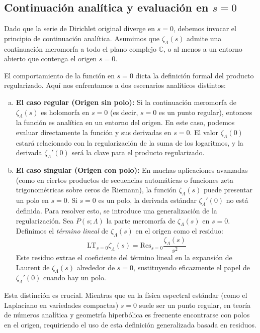 \subsection{Continuación analítica y evaluación en $s=0$}

Dado que la serie de Dirichlet original diverge en $s=0$, debemos invocar el principio de continuación analítica. Asumimos que $\zeta_\Lambda(s)$ admite una continuación meromorfa a todo el plano complejo $\mathbb{C}$, o al menos a un entorno abierto que contenga el origen $s=0$. 

El comportamiento de la función en $s=0$ dicta la definición formal del producto regularizado. Aquí nos enfrentamos a dos escenarios analíticos distintos:

\begin{enumerate}[a)]
    \item \textbf{El caso regular (Origen sin polo):} Si la continuación meromorfa de $\zeta_\Lambda(s)$ es holomorfa en $s=0$ (es decir, $s=0$ es un punto regular), entonces la función es analítica en un entorno del origen. En este caso, podemos evaluar directamente la función y sus derivadas en $s=0$. El valor $\zeta_\Lambda(0)$ estará relacionado con la regularización de la suma de los logaritmos, y la derivada $\zeta_\Lambda'(0)$ será la clave para el producto regularizado.
    
    \item \textbf{El caso singular (Origen con polo):} En muchas aplicaciones avanzadas (como en ciertos productos de secuencias automáticas o funciones zeta trigonométricas sobre ceros de Riemann), la función $\zeta_\Lambda(s)$ puede presentar un polo en $s=0$. Si $s=0$ es un polo, la derivada estándar $\zeta_\Lambda'(0)$ no está definida. Para resolver esto, se introduce una generalización de la regularización. Sea $P(s; \Lambda)$ la parte meromorfa de $\zeta_\Lambda(s)$ en $s=0$. Definimos el \textit{término lineal} de $\zeta_\Lambda(s)$ en el origen como el residuo:
    $$ \text{LT}_{s=0} \zeta_\Lambda(s) = \text{Res}_{s=0} \frac{\zeta_\Lambda(s)}{s^2} $$
    Este residuo extrae el coeficiente del término lineal en la expansión de Laurent de $\zeta_\Lambda(s)$ alrededor de $s=0$, sustituyendo eficazmente el papel de $\zeta_\Lambda'(0)$ cuando hay un polo.
\end{enumerate}

Esta distinción es crucial. Mientras que en la física espectral estándar (como el Laplaciano en variedades compactas) $s=0$ suele ser un punto regular, en teoría de números analítica y geometría hiperbólica es frecuente encontrarse con polos en el origen, requiriendo el uso de esta definición generalizada basada en residuos.



